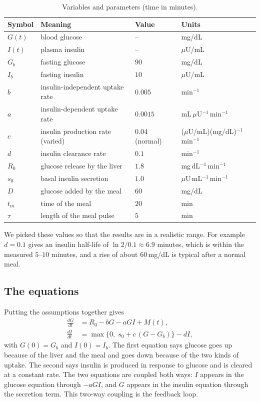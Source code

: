 \documentclass[11pt,a4paper]{article}
\newcommand{\Gb}{G_b}
\newcommand{\Ib}{I_b}
\begin{document}
\begin{table}[H]
\centering
\caption{Variables and parameters (time in minutes).}
\label{tab:params}
\small
\begin{tabular}{llll}
\toprule
Symbol & Meaning & Value & Units \\
\midrule
$G(t)$ & blood glucose & -- & mg/dL \\
$I(t)$ & plasma insulin & -- & $\mu$U/mL \\
$\Gb$ & fasting glucose & $90$ & mg/dL \\
$\Ib$ & fasting insulin & $10$ & $\mu$U/mL \\
$b$ & insulin-independent uptake rate & $0.005$ & min$^{-1}$ \\
$a$ & insulin-dependent uptake rate & $0.0015$ & mL\,$\mu$U$^{-1}$\,min$^{-1}$ \\
$c$ & insulin production rate (varied) & $0.04$ (normal) & ($\mu$U/mL)(mg/dL)$^{-1}$min$^{-1}$ \\
$d$ & insulin clearance rate & $0.1$ & min$^{-1}$ \\
$R_0$ & glucose release by the liver & $1.8$ & mg\,dL$^{-1}$\,min$^{-1}$ \\
$s_0$ & basal insulin secretion & $1.0$ & $\mu$U\,mL$^{-1}$\,min$^{-1}$ \\
$D$ & glucose added by the meal & $60$ & mg/dL \\
$t_m$ & time of the meal & $20$ & min \\
$\tau$ & length of the meal pulse & $5$ & min \\
\bottomrule
\end{tabular}
\end{table}

We picked these values so that the results are in a realistic range. For example $d=0.1$ gives an insulin half-life of $\ln2/0.1\approx6.9$ minutes, which is within the measured $5$--$10$ minutes, and a rise of about $60$\,mg/dL is typical after a normal meal.

\subsection{The equations}
Putting the assumptions together gives
\begin{align}
\frac{dG}{dt} &= R_0 - bG - aGI + M(t), \label{eq:G}\\[4pt]
\frac{dI}{dt} &= \max\{0,\; s_0 + c\,(G-\Gb)\} - dI, \label{eq:I}
\end{align}
with $G(0)=\Gb$ and $I(0)=\Ib$. The first equation says glucose goes up because of the liver and the meal and goes down because of the two kinds of uptake. The second says insulin is produced in response to glucose and is cleared at a constant rate. The two equations are coupled both ways: $I$ appears in the glucose equation through $-aGI$, and $G$ appears in the insulin equation through the secretion term. This two-way coupling is the feedback loop.
\end{document}
